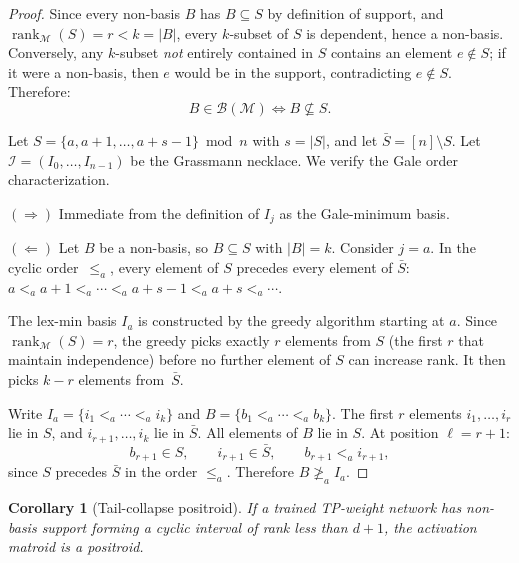 \documentclass[11pt]{article}
\newtheorem{corollary}[theorem]{Corollary}
\theoremstyle{definition}
\theoremstyle{remark}
\newcommand{\cI}{\mathcal{I}}
\newcommand{\cB}{\mathcal{B}}
\newcommand{\cM}{\mathcal{M}}
\DeclareMathOperator{\rank}{rank}
\begin{document}
\begin{proof}
  Since every non-basis $B$ has $B \subseteq S$ by definition of
  support, and $\rank_\cM(S) = r < k = |B|$, every $k$-subset of
  $S$ is dependent, hence a non-basis.  Conversely, any $k$-subset
  \emph{not} entirely contained in $S$ contains an element
  $e \notin S$; if it were a non-basis, then $e$ would be in the
  support, contradicting $e \notin S$.  Therefore:
  \begin{equation}\label{eq:basis-characterization}
    B \in \cB(\cM) \iff B \not\subseteq S.
  \end{equation}

  Let $S = \{a, a{+}1, \ldots, a{+}s{-}1\} \bmod n$ with $s = |S|$,
  and let $\bar S = [n] \setminus S$.  Let $\cI = (I_0, \ldots,
  I_{n-1})$ be the Grassmann necklace.  We verify the Gale order
  characterization.

  \smallskip\noindent
  $(\Rightarrow)$\; Immediate from the definition of $I_j$ as the
  Gale-minimum basis.

  \smallskip\noindent
  $(\Leftarrow)$\; Let $B$ be a non-basis, so $B \subseteq S$ with
  $|B| = k$.  Consider $j = a$.  In the cyclic order~$\leq_a$,
  every element of $S$ precedes every element of $\bar S$:
  $a <_a a{+}1 <_a \cdots <_a a{+}s{-}1 <_a a{+}s <_a \cdots$.

  The lex-min basis $I_a$ is constructed by the greedy algorithm
  starting at $a$.  Since $\rank_\cM(S) = r$, the greedy picks
  exactly $r$ elements from $S$ (the first $r$ that maintain
  independence) before no further element of $S$ can increase rank.
  It then picks $k - r$ elements from~$\bar{S}$.

  Write $I_a = \{i_1 <_a \cdots <_a i_k\}$ and
  $B = \{b_1 <_a \cdots <_a b_k\}$.  The first $r$ elements
  $i_1, \ldots, i_r$ lie in $S$, and $i_{r+1}, \ldots, i_k$ lie
  in $\bar{S}$.  All elements of $B$ lie in $S$.  At position
  $\ell = r + 1$:
  \[
    b_{r+1} \in S, \qquad i_{r+1} \in \bar{S}, \qquad
    b_{r+1} <_a i_{r+1},
  \]
  since $S$ precedes $\bar{S}$ in the order $\leq_a$.  Therefore
  $B \not\geq_a I_a$.
\end{proof}

\begin{corollary}[Tail-collapse positroid]\label{cor:tail-collapse}
  If a trained TP-weight network has non-basis support forming a
  cyclic interval of rank less than $d + 1$, the activation matroid
  is a positroid.
\end{corollary}
\end{document}
